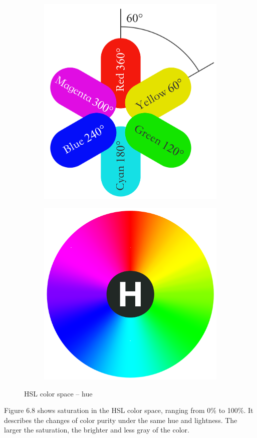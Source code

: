 \documentclass[a4paper,12pt,openany]{book}
\begin{document}
\begin{figure}[h!]
    \Centering
    \begin{subfigure}{0.4\textwidth}
        \RaggedLeft
        \includegraphics[height=0.8\textwidth]{D6Z/6-7a} 
    \end{subfigure}\hspace{1em}
    \begin{subfigure}{0.4\textwidth}
        \RaggedRight
        \includegraphics[height=0.7\textwidth]{D6Z/6-7b}
    \end{subfigure}
    \caption{HSL color space – hue}
\end{figure}

Figure 6.8 shows saturation in the HSL color space, ranging from 0\% to 100\%. It describes the changes of color purity under the same hue and lightness. The larger the saturation, the brighter and less gray of the color.
\end{document}
